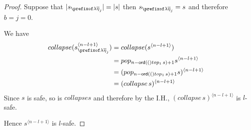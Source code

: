 \documentclass[a4paper]{article}
\theoremstyle{remark}
\theoremstyle{definition}
\begin{document}
\begin{proof}
Suppose that $|s_{\prefixof \lambda\overline\eta_j}|=|s|$ then $s_{\prefixof \lambda\overline\eta_j}=s$ and therefore $b=j=0$.

We have
\begin{align*}
  collapse(s_{\prefixof \lambda\overline\eta_j}^{\langle n-l+1\rangle})
  &= collapse(s^{\langle n-l+1\rangle}) \\
  &= pop_{n-\ord(top_1\, s)+1} s^{\langle n-l+1\rangle} \\
  &= (pop_{n-\ord(top_1\, s)+1} s)^{\langle n-l+1\rangle} \\
  &= (collapse\, s)^{\langle n-l+1\rangle}
\end{align*}
Since $s$ is safe, so is $collapse s$ and therefore by the I.H.,
$(collapse\, s)^{\langle n-l+1\rangle}$ is $l$-safe.

Hence $s^{\langle n-l+1 \rangle}$ is $l$-safe.
\end{proof}
\end{document}
